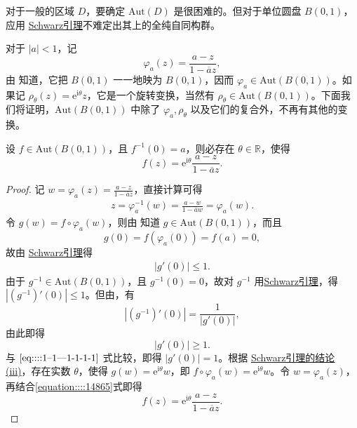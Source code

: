 \documentclass[../../main.tex]{subfiles}%
\begin{document}
对于一般的区域 \( D \)，要确定 \( \text{Aut}(D) \) 是很困难的。但对于单位圆盘 \( B(0,1) \)，应用 \hyperref[theorem:Schwarz引理-定理4.5.3]{Schwarz引理}不难定出其上的全纯自同构群。

对于 \( |a| < 1 \)，记
\[
\varphi_a(z) = \frac{a - z}{1 - \overline{a} z},
\]
由 知道，它把 \( B(0,1) \) 一一地映为 \( B(0,1) \)，因而 \( \varphi_a \in \text{Aut}(B(0,1)) \)。如果记 \( \rho_\theta(z) = \mathrm{e}^{\mathrm{i}\theta} z \)，它是一个旋转变换，当然有 \( \rho_\theta \in \text{Aut}(B(0,1)) \)。下面我们将证明，\( \text{Aut}(B(0,1)) \) 中除了 \( \varphi_a, \rho_\theta \) 以及它们的复合外，不再有其他的变换。

\begin{theorem}\label{theorem:定理4.5.5}
设 \( f \in \text{Aut}(B(0,1)) \)，且 \( f^{-1}(0) = a \)，则必存在 \( \theta \in \mathbb{R} \)，使得
\[
f(z) = \mathrm{e}^{\mathrm{i}\theta} \frac{a - z}{1 - \overline{a} z}.
\]
\end{theorem}
\begin{proof}

记 \( w = \varphi_a(z)= \frac{a - z}{1 - \overline{a} z} \)，直接计算可得
\begin{align}\label{equation::::14865}
z = \varphi_a^{-1}(w) = \frac{a - w}{1 - \overline{a} w} = \varphi_a(w).
\end{align}
令 \( g(w) = f \circ \varphi_a(w) \)，则由 知道 \( g \in \text{Aut}(B(0,1)) \)，而且
\[
g(0) = f(\varphi_a(0)) = f(a) = 0,
\]
故由 \hyperref[theorem:Schwarz引理-定理4.5.3]{Schwarz引理}得
\begin{align}
|g'(0)| \leqslant  1.\label{eq::::1--1---1-1-1-1}
\end{align}
由于 \( g^{-1} \in \text{Aut}(B(0,1)) \)，且 \( g^{-1}(0) = 0 \)，故对 \( g^{-1} \) 用\hyperref[theorem:Schwarz引理-定理4.5.3]{Schwarz引理}，得 \( |(g^{-1})'(0)| \leqslant  1 \)。但由，有
\[
|(g^{-1})'(0)| = \frac{1}{|g'(0)|},
\]
由此即得
\[
|g'(0)| \geqslant  1.
\]
与 \(\eqref{eq::::1--1---1-1-1-1}\) 式比较，即得 \( |g'(0)| = 1 \)。根据 \hyperref[theorem:Schwarz引理-定理4.5.3]{Schwarz引理的结论(iii)}，存在实数 \( \theta \)，使得 \( g(w) = \mathrm{e}^{\mathrm{i}\theta} w \)，即 \( f \circ \varphi_a(w) = \mathrm{e}^{\mathrm{i}\theta} w \)。令 \( w = \varphi_a(z) \)，再结合\eqref{equation::::14865}式即得
\[
f(z) = \mathrm{e}^{\mathrm{i}\theta} \frac{a - z}{1 - \overline{a} z}.
\] 

\end{proof}
\end{document}
